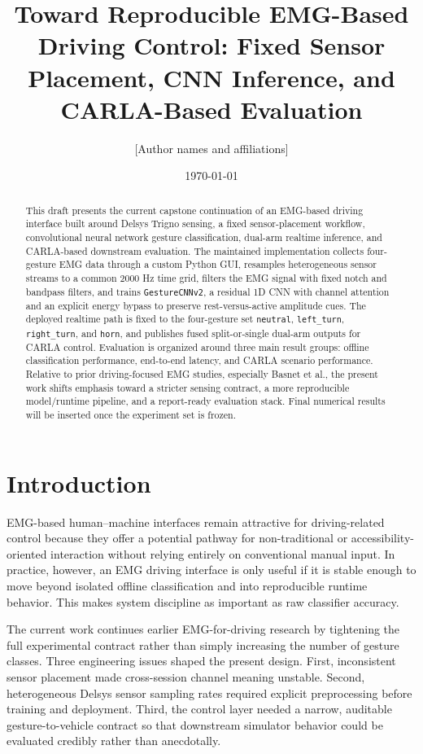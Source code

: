 \documentclass[11pt]{article}
\title{Toward Reproducible EMG-Based Driving Control: Fixed Sensor Placement, CNN Inference, and CARLA-Based Evaluation}
\author{[Author names and affiliations]}
\date{\today}
\begin{document}
\maketitle

\begin{abstract}
This draft presents the current capstone continuation of an EMG-based driving interface built around Delsys Trigno sensing, a fixed sensor-placement workflow, convolutional neural network gesture classification, dual-arm realtime inference, and CARLA-based downstream evaluation. The maintained implementation collects four-gesture EMG data through a custom Python GUI, resamples heterogeneous sensor streams to a common 2000 Hz time grid, filters the EMG signal with fixed notch and bandpass filters, and trains \texttt{GestureCNNv2}, a residual 1D CNN with channel attention and an explicit energy bypass to preserve rest-versus-active amplitude cues. The deployed realtime path is fixed to the four-gesture set \texttt{neutral}, \texttt{left\_turn}, \texttt{right\_turn}, and \texttt{horn}, and publishes fused split-or-single dual-arm outputs for CARLA control. Evaluation is organized around three main result groups: offline classification performance, end-to-end latency, and CARLA scenario performance. Relative to prior driving-focused EMG studies, especially Basnet et al., the present work shifts emphasis toward a stricter sensing contract, a more reproducible model/runtime pipeline, and a report-ready evaluation stack. Final numerical results will be inserted once the experiment set is frozen.
\end{abstract}

\section{Introduction}
EMG-based human--machine interfaces remain attractive for driving-related control because they offer a potential pathway for non-traditional or accessibility-oriented interaction without relying entirely on conventional manual input. In practice, however, an EMG driving interface is only useful if it is stable enough to move beyond isolated offline classification and into reproducible runtime behavior. This makes system discipline as important as raw classifier accuracy.

The current work continues earlier EMG-for-driving research by tightening the full experimental contract rather than simply increasing the number of gesture classes. Three engineering issues shaped the present design. First, inconsistent sensor placement made cross-session channel meaning unstable. Second, heterogeneous Delsys sensor sampling rates required explicit preprocessing before training and deployment. Third, the control layer needed a narrow, auditable gesture-to-vehicle contract so that downstream simulator behavior could be evaluated credibly rather than anecdotally.
\end{document}
